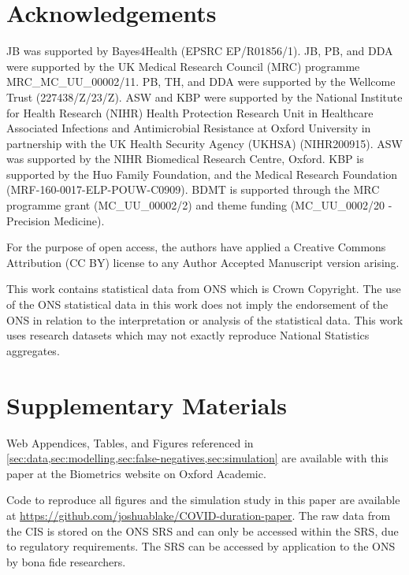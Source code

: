 \documentclass[referee,useAMS,usenatbib]{biom}
\begin{document}
\section*{Acknowledgements}
JB was supported by Bayes4Health (EPSRC  EP/R01856/1).
JB, PB, and DDA were supported by the UK Medical Research Council (MRC) programme MRC\_MC\_UU\_00002/11. 
PB, TH, and DDA were supported by the Wellcome Trust (227438/Z/23/Z).
ASW and KBP were supported by the National Institute for Health Research (NIHR) Health Protection Research Unit in Healthcare Associated Infections and Antimicrobial Resistance at Oxford University in partnership with the UK Health Security Agency (UKHSA) (NIHR200915).
ASW was supported by the NIHR Biomedical Research Centre, Oxford.
KBP is supported by the Huo Family Foundation, and the Medical Research Foundation (MRF-160-0017-ELP-POUW-C0909).
BDMT is supported through the MRC programme grant (MC\_UU\_00002/2) and theme funding (MC\_UU\_0002/20 - Precision Medicine).

For the purpose of open access, the authors have applied a Creative Commons Attribution (CC BY) license to any Author Accepted Manuscript version arising.

This work contains statistical data from ONS which is Crown Copyright. The use of the ONS statistical data in this work does not imply the endorsement of the ONS in relation to the interpretation or analysis of the statistical data. This work uses research datasets which may not exactly reproduce National Statistics aggregates.

 

\section*{Supplementary Materials}

Web Appendices, Tables, and Figures referenced in \cref{sec:data,sec:modelling,sec:false-negatives,sec:simulation} are available with this paper at the Biometrics website on Oxford Academic.

Code to reproduce all figures and the simulation study in this paper are available at \url{https://github.com/joshuablake/COVID-duration-paper}.
The raw data from the CIS is stored on the ONS SRS and can only be accessed within the SRS, due to regulatory requirements.
The SRS can be accessed by application to the ONS by bona fide researchers.

\label{lastpage}
\end{document}

